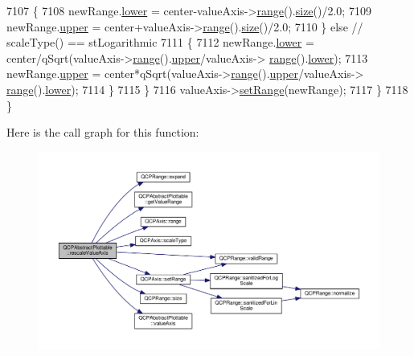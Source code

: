 \begin{DoxyCode}
7107       \{
7108         newRange.\hyperlink{class_q_c_p_range_aa3aca3edb14f7ca0c85d912647b91745}{lower} = center-valueAxis->\hyperlink{class_q_c_p_axis_ab1ea79a4f5ea4cf42620f8f51c477ac4}{range}().\hyperlink{class_q_c_p_range_afa57c13049b965edb6fd1c00ac56338a}{size}()/2.0;
7109         newRange.\hyperlink{class_q_c_p_range_ae44eb3aafe1d0e2ed34b499b6d2e074f}{upper} = center+valueAxis->\hyperlink{class_q_c_p_axis_ab1ea79a4f5ea4cf42620f8f51c477ac4}{range}().\hyperlink{class_q_c_p_range_afa57c13049b965edb6fd1c00ac56338a}{size}()/2.0;
7110       \} \textcolor{keywordflow}{else} \textcolor{comment}{// scaleType() == stLogarithmic}
7111       \{
7112         newRange.\hyperlink{class_q_c_p_range_aa3aca3edb14f7ca0c85d912647b91745}{lower} = center/qSqrt(valueAxis->\hyperlink{class_q_c_p_axis_ab1ea79a4f5ea4cf42620f8f51c477ac4}{range}().\hyperlink{class_q_c_p_range_ae44eb3aafe1d0e2ed34b499b6d2e074f}{upper}/valueAxis->
      \hyperlink{class_q_c_p_axis_ab1ea79a4f5ea4cf42620f8f51c477ac4}{range}().\hyperlink{class_q_c_p_range_aa3aca3edb14f7ca0c85d912647b91745}{lower});
7113         newRange.\hyperlink{class_q_c_p_range_ae44eb3aafe1d0e2ed34b499b6d2e074f}{upper} = center*qSqrt(valueAxis->\hyperlink{class_q_c_p_axis_ab1ea79a4f5ea4cf42620f8f51c477ac4}{range}().\hyperlink{class_q_c_p_range_ae44eb3aafe1d0e2ed34b499b6d2e074f}{upper}/valueAxis->
      \hyperlink{class_q_c_p_axis_ab1ea79a4f5ea4cf42620f8f51c477ac4}{range}().\hyperlink{class_q_c_p_range_aa3aca3edb14f7ca0c85d912647b91745}{lower});
7114       \}
7115     \}
7116     valueAxis->\hyperlink{class_q_c_p_axis_aebdfea5d44c3a0ad2b4700cd4d25b641}{setRange}(newRange);
7117   \}
7118 \}
\end{DoxyCode}


Here is the call graph for this function\+:\nopagebreak
\begin{figure}[H]
\begin{center}
\leavevmode
\includegraphics[width=350pt]{class_q_c_p_abstract_plottable_abfd0805eb1d955c0111a990246658324_cgraph}
\end{center}
\end{figure}




